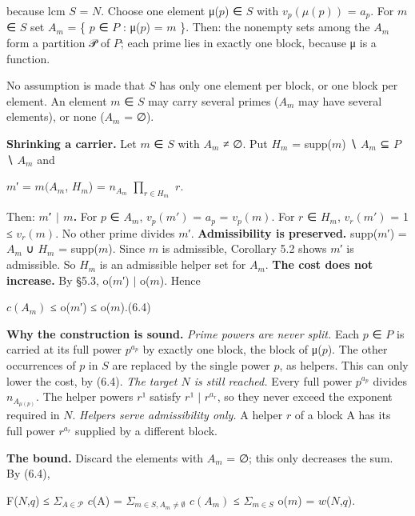 \documentclass[pdflatex,sn-mathphys-num]{sn-jnl}
\theoremstyle{thmstyleone}
\theoremstyle{thmstylethree}
\begin{document}
because lcm \(S\) = \(N\). Choose one element μ(\(p\)) ∈ \(S\) with \(v_p(μ(p))\) = \(a_p\). For \(m\) ∈ \(S\) set \(A_m\) = \{ \(p\) ∈ \(P\) : μ(\(p\)) = \(m\) \}. Then: the nonempty sets among the \(A_m\) form a partition 𝒫 of \(P\); each prime lies in exactly one block, because μ is a function.

No assumption is made that \(S\) has only one element per block, or one block per element. An element \(m\) ∈ \(S\) may carry several primes (\(A_m\) may have several elements), or none (\(A_m\) = ∅).

\textbf{Shrinking a carrier.} Let \(m\) ∈ \(S\) with \(A_m\) ≠ ∅. Put \(H_m\) = supp(\(m\)) ∖ \(A_m\) ⊆ \(P\) ∖ \(A_m\) and

\begin{center}\(m\)′ = \(m(A_m\), \(H_m\)) = \(n_{A_m}\) \(∏_{r∈H_m}\) \(r\).\end{center}

Then: \textbf{\(m\)′ \(\mid\) \(m\).} For \(p\) ∈ \(A_m\), \(v_p(m′)\) = \(a_p\) = \(v_p(m)\). For \(r\) ∈ \(H_m\), \(v_r(m′)\) = 1 ≤ \(v_r(m)\). No other prime divides \(m\)′. \textbf{Admissibility is preserved.} supp(\(m\)′) = \(A_m\) ∪ \(H_m\) = supp(\(m\)). Since \(m\) is admissible, Corollary 5.2 shows \(m\)′ is admissible. So \(H_m\) is an admissible helper set for \(A_m\). \textbf{The cost does not increase.} By §5.3, o(\(m\)′) \(\mid\) o(\(m\)). Hence

\begin{center}\(c(A_m)\) ≤ o(\(m\)′) ≤ o(\(m\)).\qquad (6.4)\end{center}

\textbf{Why the construction is sound.} \emph{Prime powers are never split.} Each \(p\) ∈ \(P\) is carried at its full power \(p^{a_p}\) by exactly one block, the block of μ(\(p\)). The other occurrences of \(p\) in \(S\) are replaced by the single power \(p\), as helpers. This can only lower the cost, by (6.4). \emph{The target \(N\) is still reached.} Every full power \(p^{a_p}\) divides \(n_{A_{μ(p)}}\). The helper powers \(r\)¹ satisfy \(r\)¹ \(\mid\) \(r^{a_r}\), so they never exceed the exponent required in \(N\). \emph{Helpers serve admissibility only.} A helper \(r\) of a block A has its full power \(r^{a_r}\) supplied by a different block.

\textbf{The bound.} Discard the elements with \(A_m\) = ∅; this only decreases the sum. By (6.4),

\begin{center}F(\(N\),\(q\)) ≤ \(Σ_{A∈𝒫}\) \(c\)(A) = \(Σ_{m∈S,A_m≠∅}\) \(c(A_m)\) ≤ \(Σ_{m∈S}\) o(\(m\)) = \(w\)(\(N\),\(q\)).\end{center}
\end{document}
